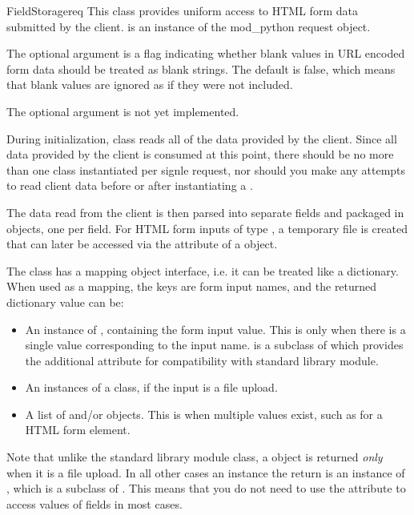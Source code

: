 \begin{classdesc}{FieldStorage}{req}
This class provides uniform access to HTML form data submitted by the
client.   is an instance of the mod_python request object.

The optional argument  is a flag indicating
whether blank values in URL encoded form data should be treated as
blank strings. The default is false, which means that blank values are
ignored as if they were not included.

The optional argument  is not yet implemented.

During initialization,  class reads all of the
data provided by the client. Since all data provided by the client is
consumed at this point, there should be no more than one
 class instantiated per signle request, nor should
you make any attempts to read client data before or after
instantiating a .

The data read from the client is then parsed into separate fields and
packaged in  objects, one per field. For HTML form inputs
of type , a temporary file is created that can later be
accessed via the  attribute of a  object.

The  class has a mapping object interface, i.e. it
can be treated like a dictionary. When used as a mapping, the keys are
form input names, and the returned dictionary value can be:

\begin{itemize}
\item
An instance of , containing the form input
value. This is only when there is a single value corresponding to the
input name.  is a subclass of  which
provides the additional  attribute for compatibility
with standard library  module.
\item
An instances of a  class, if the input is a file upload.
\item
A list of  and/or  objects. This is
when multiple values exist, such as for a  HTML form
element.
\end{itemize}

Note that unlike the standard library  module
 class, a  object is returned
\emph{only} when it is a file upload. In all other cases an instance
the return is an instance of , which is a subclass
of . This means that you do not need to use the
 attribute to access values of fields in most cases.


\end{classdesc}

